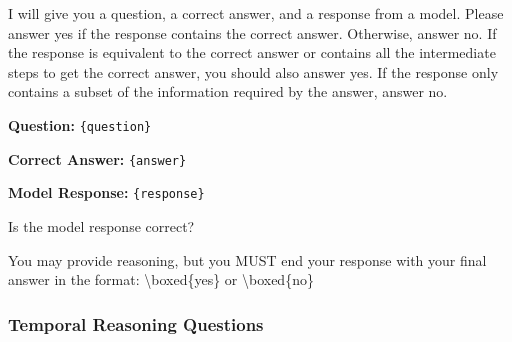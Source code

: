 \begin{tcolorbox}[
    colback=teal!5!white,
    colframe=teal!60!black,
    title=Judge Prompt: Single/Multi-Session Questions,
    fonttitle=\bfseries,
    coltitle=white,
    colbacktitle=teal!60!black,
    boxrule=1.0pt,
    arc=1.5mm,
    enhanced,
    breakable
]
\small
I will give you a question, a correct answer, and a response from a model. Please answer yes if the response contains the correct answer. Otherwise, answer no. If the response is equivalent to the correct answer or contains all the intermediate steps to get the correct answer, you should also answer yes. If the response only contains a subset of the information required by the answer, answer no.

\vspace{0.2cm}

\textbf{Question:} \texttt{\{question\}}

\textbf{Correct Answer:} \texttt{\{answer\}}

\textbf{Model Response:} \texttt{\{response\}}

\vspace{0.2cm}

Is the model response correct?

You may provide reasoning, but you MUST end your response with your final answer in the format: \textbackslash boxed\{yes\} or \textbackslash boxed\{no\}
\end{tcolorbox}

\subsubsection{Temporal Reasoning Questions}

